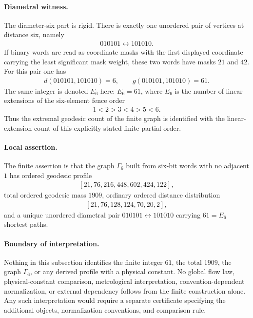 \paragraph{Diametral witness.}
The diameter-six part is rigid.  There is exactly one unordered pair of vertices at distance six, namely
$$
\begin{aligned}
010101\longleftrightarrow 101010.
\end{aligned}
$$
If binary words are read as coordinate masks with the first displayed coordinate carrying the least significant mask weight, these two words have masks $21$ and $42$.  For this pair one has
$$
\begin{aligned}
d(010101,101010)=6,\qquad g(010101,101010)=61.
\end{aligned}
$$
The same integer is denoted $E_6$ here: $E_6=61$, where $E_6$ is the number of linear extensions of the six-element fence order
$$
\begin{aligned}
1<2>3<4>5<6.
\end{aligned}
$$
Thus the extremal geodesic count of the finite graph is identified with the linear-extension count of this explicitly stated finite partial order.

\paragraph{Local assertion.}
The finite assertion is that the graph $\Gamma_6$ built from six-bit words with no adjacent $1$ has ordered geodesic profile
$$
\begin{aligned}
[21,76,216,448,602,424,122],
\end{aligned}
$$
total ordered geodesic mass $1909$, ordinary ordered distance distribution
$$
\begin{aligned}
[21,76,128,124,70,20,2],
\end{aligned}
$$
and a unique unordered diametral pair $010101\leftrightarrow 101010$ carrying $61=E_6$ shortest paths.

\paragraph{Boundary of interpretation.}
Nothing in this subsection identifies the finite integer $61$, the total $1909$, the graph $\Gamma_6$, or any derived profile with a physical constant.  No global flow law, physical-constant comparison, metrological interpretation, convention-dependent normalization, or external dependency follows from the finite construction alone.  Any such interpretation would require a separate certificate specifying the additional objects, normalization conventions, and comparison rule.
